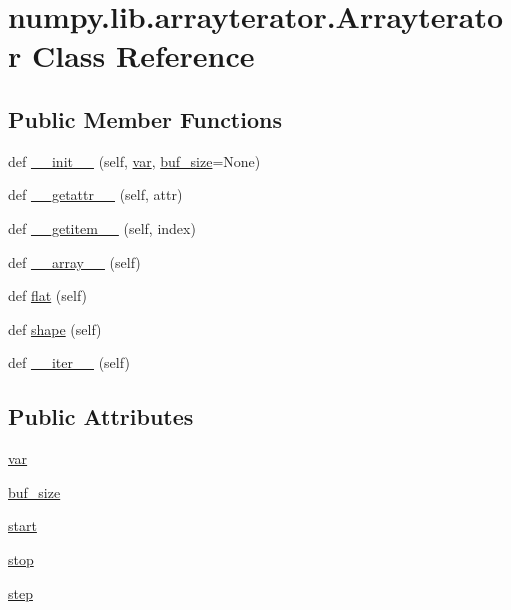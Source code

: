\hypertarget{classnumpy_1_1lib_1_1arrayterator_1_1Arrayterator}{}\section{numpy.\+lib.\+arrayterator.\+Arrayterator Class Reference}
\label{classnumpy_1_1lib_1_1arrayterator_1_1Arrayterator}
\subsection*{Public Member Functions}
\begin{DoxyCompactItemize}
\item 
def \hyperlink{classnumpy_1_1lib_1_1arrayterator_1_1Arrayterator_aa59f1e7c2cf876158f1f7190784ab083}{\+\_\+\+\_\+init\+\_\+\+\_\+} (self, \hyperlink{classnumpy_1_1lib_1_1arrayterator_1_1Arrayterator_a89348d729a6a0545af6820167174a6cf}{var}, \hyperlink{classnumpy_1_1lib_1_1arrayterator_1_1Arrayterator_a6d964e3482e3b68c1fef6aeeea60ba89}{buf\+\_\+size}=None)
\item 
def \hyperlink{classnumpy_1_1lib_1_1arrayterator_1_1Arrayterator_a3ef77bdaab9f40b1e0bc926bb7d45942}{\+\_\+\+\_\+getattr\+\_\+\+\_\+} (self, attr)
\item 
def \hyperlink{classnumpy_1_1lib_1_1arrayterator_1_1Arrayterator_ad8283e155240f70470e4c4b88d003172}{\+\_\+\+\_\+getitem\+\_\+\+\_\+} (self, index)
\item 
def \hyperlink{classnumpy_1_1lib_1_1arrayterator_1_1Arrayterator_a9d0cbdcad2cdac68791ca112378efe04}{\+\_\+\+\_\+array\+\_\+\+\_\+} (self)
\item 
def \hyperlink{classnumpy_1_1lib_1_1arrayterator_1_1Arrayterator_a69d2bd2bce37726add2ab09186bee9e8}{flat} (self)
\item 
def \hyperlink{classnumpy_1_1lib_1_1arrayterator_1_1Arrayterator_a547921c8112ebd555c7a5759c605bea4}{shape} (self)
\item 
def \hyperlink{classnumpy_1_1lib_1_1arrayterator_1_1Arrayterator_a0031dbbe898c115630176db0d2a06f88}{\+\_\+\+\_\+iter\+\_\+\+\_\+} (self)
\end{DoxyCompactItemize}
\subsection*{Public Attributes}
\begin{DoxyCompactItemize}
\item 
\hyperlink{classnumpy_1_1lib_1_1arrayterator_1_1Arrayterator_a89348d729a6a0545af6820167174a6cf}{var}
\item 
\hyperlink{classnumpy_1_1lib_1_1arrayterator_1_1Arrayterator_a6d964e3482e3b68c1fef6aeeea60ba89}{buf\+\_\+size}
\item 
\hyperlink{classnumpy_1_1lib_1_1arrayterator_1_1Arrayterator_ab4baeba51d42012abbcebaf3a22077dc}{start}
\item 
\hyperlink{classnumpy_1_1lib_1_1arrayterator_1_1Arrayterator_a2fecf67a27b63fd9f8ad1a8081702971}{stop}
\item 
\hyperlink{classnumpy_1_1lib_1_1arrayterator_1_1Arrayterator_aa9e131bed7d4b9c42796fa45dead649e}{step}
\end{DoxyCompactItemize}



